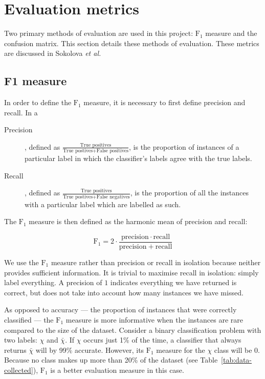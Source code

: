   \section{Evaluation metrics}
    Two primary methods of evaluation are used in this project: $\mathrm{F}_1$ measure and the confusion matrix.
    This section details these methods of evaluation. These metrics are discussed in Sokolova \emph{et al.}\cite{sokolova2009systematic}
    \subsection{F1 measure}
      In order to define the $\mathrm{F}_1$ measure, it is necessary to first define precision and recall. In a 
      \begin{description}
        \item[Precision], defined as $\frac{\text{True positives}}{\text{True postives} + \text{False positives}}$, is the proportion of instances of a particular label in which the classifier's labels agree with the true labels.
        \item[Recall], defined as $\frac{\text{True positives}}{\text{True postives} + \text{False negatives}}$, is the proportion of all the instances with a particular label which are labelled as such. 
      \end{description}
      
      The $\mathrm{F}_1$ measure is then defined as the harmonic mean of precision and recall:
      
      $$\mathrm{F}_1 = 2 \cdot \frac{\mathrm{precision} \cdot \mathrm{recall}}{\mathrm{precision} + \mathrm{recall}}$$
      
      We use the $\mathrm{F}_1$ measure rather than precision or recall in isolation because neither provides sufficient information. It is trivial to maximise recall in isolation: simply label everything. A precision of $1$ indicates everything we have returned is correct, but does not take into account how many instances we have missed.
      
      As opposed to accuracy --- the proportion of instances that were correctly classified --- the $\mathrm{F}_1$ measure is more informative when the instances are rare compared to the size of the dataset. Consider a binary classification problem with two labels: $\chi$ and $\bar{\chi}$. If $\chi$ occurs just 1\% of the time, a classifier that always returns $\bar{\chi}$ will by 99\% accurate. However, its  $\mathrm{F}_1$ measure for the $\chi$ class will be 0. Because no class makes up more than 20\% of the dataset (see Table~\ref{tab:data-collected}), $\mathrm{F}_1$ is a better evaluation measure in this case.
    
